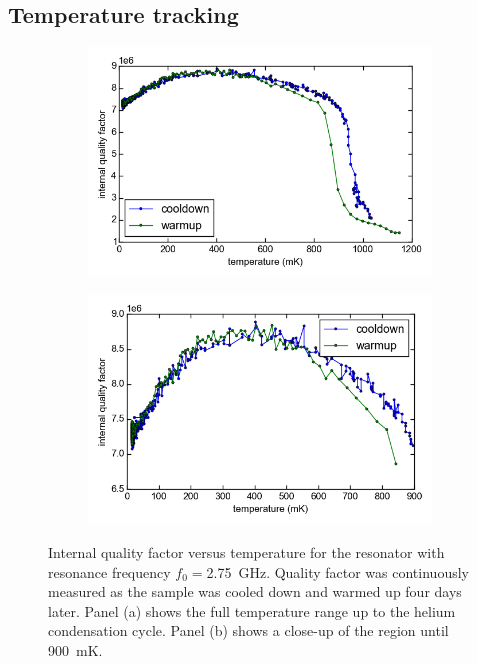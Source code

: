 \subsection{Temperature tracking}
\label{resonator:results:temperature_tracking}
\begin{figure}[h]
    \centering
    \begin{subfigure}[b]{.49\textwidth}
        \label{fig:temperature_tracking_Qi_drop}
        \includegraphics[width=\textwidth]{Figures/DRIE/Temperature tracking drop - Qi vs T.png}
    \end{subfigure}
    \begin{subfigure}[b]{.49\textwidth}
        \label{fig:temperature_tracking_Qi_nodrop}
        \includegraphics[width=\textwidth]{Figures/DRIE/Temperature tracking - no drop - Qi vs T.png}
    \end{subfigure}
    \caption{Internal quality factor versus temperature for the resonator with resonance frequency $f_0= $\SI{2.75}{\giga \hertz}. Quality factor was continuously measured as the sample was cooled down and warmed up four days later. Panel (a) shows the full temperature range up to the helium condensation cycle. Panel (b) shows a close-up of the region until \SI{900}{\milli \kelvin}.}
    \label{fig:temperature_tracking_Qi}
\end{figure}

